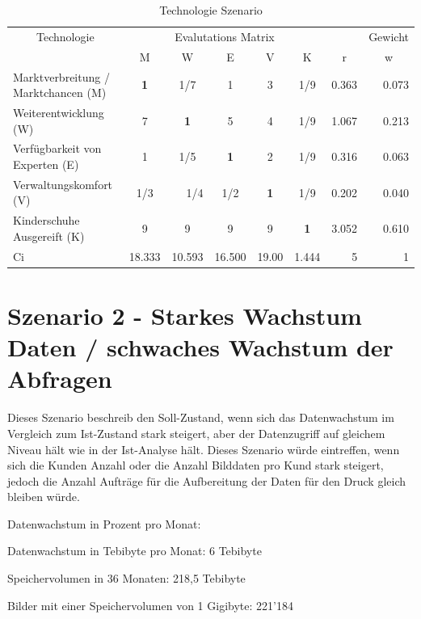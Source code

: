 \begin{table}[htbp]
\caption{Technologie Szenario}
\begin{tabular}{|p{3.9cm}|c|c|c|c|c|r|r|}
\hline
\multicolumn{ 1}{|c|}{Technologie} & \multicolumn{ 5}{c|}{Evalutations Matrix} & \multicolumn{1}{l|}{} & \multicolumn{1}{l|}{Gewicht} \\ \cline{ 2- 8}
\multicolumn{ 1}{|c|}{} & M & W & E & V & K & \multicolumn{1}{c|}{r} & \multicolumn{1}{c|}{w} \\ \hline
Marktverbreitung / Marktchancen (M) & \textbf{1} &  1/7 & 1 & 3 &  1/9 & 0.363 & 0.073 \\ \hline
Weiterentwicklung (W) & 7 & \textbf{1} & 5 & 4 &  1/9 & 1.067 & 0.213 \\ \hline
Verfügbarkeit von Experten (E) & 1 &  1/5 & \textbf{1} & 2 &  1/9 & 0.316 & 0.063 \\ \hline
Verwaltungskomfort (V) &  1/3 & \multicolumn{1}{r|}{ 1/4} &  1/2 & \textbf{1} &  1/9 & 0.202 & 0.040 \\ \hline
Kinderschuhe Ausgereift (K) & 9 & 9 & 9 & 9 & \textbf{1} & 3.052 & 0.610 \\ \hline  \hline
Ci & \multicolumn{1}{r|}{18.333} & \multicolumn{1}{r|}{10.593} & \multicolumn{1}{r|}{16.500} & \multicolumn{1}{r|}{19.00} & \multicolumn{1}{r|}{1.444} & 5 & 1 \\ \hline
\end{tabular}
\label{AHPTechnologieS}
\end{table}



\section{Szenario 2 - Starkes Wachstum Daten / schwaches Wachstum der Abfragen}
Dieses Szenario beschreib den Soll-Zustand, wenn sich das Datenwachstum im Vergleich zum Ist-Zustand stark steigert, aber der Datenzugriff auf gleichem Niveau hält wie in der Ist-Analyse hält. Dieses Szenario würde eintreffen, wenn sich die Kunden Anzahl oder die Anzahl Bilddaten pro Kund stark steigert, jedoch die Anzahl Aufträge für die Aufbereitung der Daten für den Druck gleich bleiben würde.

Datenwachstum in Prozent pro Monat: 

Datenwachstum in Tebibyte pro Monat: 6 Tebibyte

Speichervolumen in 36 Monaten: 218,5 Tebibyte

Bilder mit einer Speichervolumen von 1 Gigibyte: 221'184


